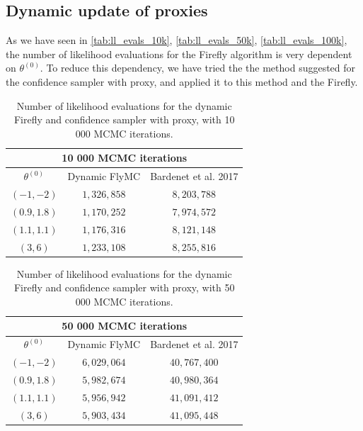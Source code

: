 \subsection{Dynamic update of proxies} 

As we have seen in \ref{tab:ll_evals_10k}, \ref{tab:ll_evals_50k}, \ref{tab:ll_evals_100k}, the number of likelihood evaluations for the Firefly algorithm is very dependent on $\theta^{\left(0\right)}$. To reduce this dependency, we have tried the the method suggested for the confidence sampler with proxy, and applied it to this method and the Firefly. 

\begin{table}[ht]
    \centering
\begin{tabular}{|c|c|c|}
  \hline
    \multicolumn{3}{|c|}{10 000 MCMC iterations} \\
    \hline
\hline
        $\theta^{\left(0\right)}$ & Dynamic FlyMC & Bardenet et al. 2017\\ 
         \hline \hline$\left(-1, -2\right)$ & $1,326,858$ & $8,203,788$ \\
        $\left(0.9, 1.8\right)$ & $1,170,252$ & $7,974,572$ \\
        $ \left(1.1, 1.1\right)$ & $1,176,316$ & $8,121,148$\\
        $\left(3,6\right)$ & $1,233,108$ & $8,255,816$ 
        \\ \hline
\end{tabular}
\caption{Number of likelihood evaluations for the dynamic Firefly and confidence sampler with proxy, with 10 000 MCMC iterations. }
\label{tab:ll_10k_dynamic}
\end{table}


 \begin{table}[ht]
    \centering
\begin{tabular}{|c|c|c|}
  \hline
    \multicolumn{3}{|c|}{50 000 MCMC iterations} \\
    \hline
\hline
        $\theta^{\left(0\right)}$ & Dynamic FlyMC & Bardenet et al. 2017\\ 
         \hline \hline$\left(-1, -2\right)$ & $6,029,064$ & $40,767,400$ \\
        $\left(0.9, 1.8\right)$ & $5,982,674$ & $40,980,364$ \\
        $ \left(1.1, 1.1\right)$ & $5,956,942$ & $41,091,412$\\
        $\left(3,6\right)$ & $5,903,434$ & $41,095,448$ 
        \\ \hline
\end{tabular}
\caption{Number of likelihood evaluations for the dynamic Firefly and confidence sampler with proxy, with 50 000 MCMC iterations.}
\label{tab:ll_50k_dynamic}
\end{table}

